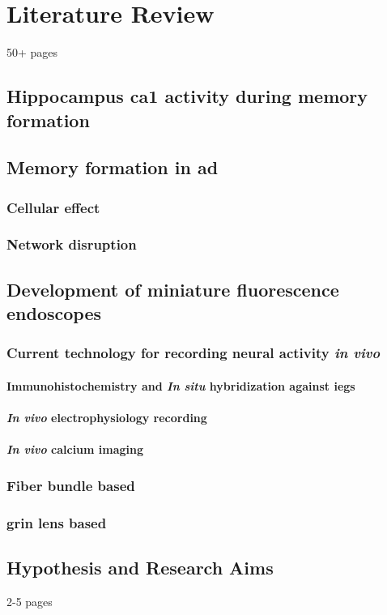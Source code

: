 \chapter{Literature Review}
50+ pages

\section{Hippocampus \gls{ca1} activity during memory formation}

\section{Memory formation in \gls{ad}}
\subsection{Cellular effect}
\subsection{Network disruption}


\section{Development of miniature fluorescence endoscopes}
\subsection{Current technology for recording neural activity \textit{in vivo}}
\subsubsection{Immunohistochemistry and \textit{In situ} hybridization against \glspl{ieg}}
\subsubsection{\textit{In vivo} electrophysiology recording}
\subsubsection{\textit{In vivo} calcium imaging}
\subsection{Fiber bundle based}
\subsection{\gls{grin} lens based}


\section{Hypothesis and Research Aims}
2-5 pages
